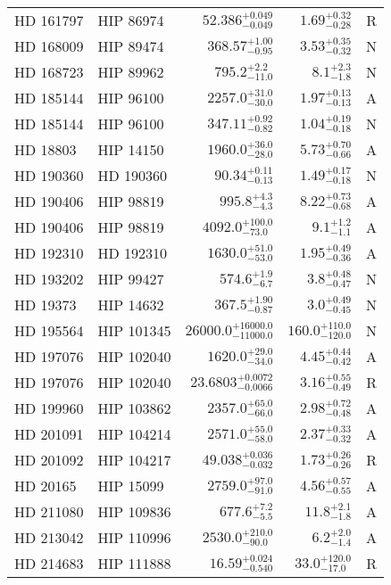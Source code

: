 \begin{longtable*}{llrrr}
HD 161797 & HIP 86974 & $52.386^{+0.049}_{-0.049}$ & $1.69^{+0.32}_{-0.28}$ & R \\
HD 168009 & HIP 89474 & $368.57^{+1.00}_{-0.95}$ & $3.53^{+0.35}_{-0.32}$ & N \\
HD 168723 & HIP 89962 & $795.2^{+2.2}_{-11.0}$ & $8.1^{+2.3}_{-1.8}$ & N \\
HD 185144 & HIP 96100 & $2257.0^{+31.0}_{-30.0}$ & $1.97^{+0.13}_{-0.13}$ & A \\
HD 185144 & HIP 96100 & $347.11^{+0.92}_{-0.82}$ & $1.04^{+0.19}_{-0.18}$ & N \\
HD 18803 & HIP 14150 & $1960.0^{+36.0}_{-28.0}$ & $5.73^{+0.70}_{-0.66}$ & A \\
HD 190360 & HD 190360 & $90.34^{+0.11}_{-0.13}$ & $1.49^{+0.17}_{-0.18}$ & N \\
HD 190406 & HIP 98819 & $995.8^{+4.3}_{-4.3}$ & $8.22^{+0.73}_{-0.68}$ & A \\
HD 190406 & HIP 98819 & $4092.0^{+100.0}_{-73.0}$ & $9.1^{+1.2}_{-1.1}$ & A \\
HD 192310 & HD 192310 & $1630.0^{+51.0}_{-53.0}$ & $1.95^{+0.49}_{-0.36}$ & A \\
HD 193202 & HIP 99427 & $574.6^{+1.9}_{-6.7}$ & $3.8^{+0.48}_{-0.47}$ & N \\
HD 19373 & HIP 14632 & $367.5^{+1.90}_{-0.87}$ & $3.0^{+0.49}_{-0.45}$ & N \\
HD 195564 & HIP 101345 & $26000.0^{+16000.0}_{-11000.0}$ & $160.0^{+110.0}_{-120.0}$ & N \\
HD 197076 & HIP 102040 & $1620.0^{+29.0}_{-34.0}$ & $4.45^{+0.44}_{-0.42}$ & A \\
HD 197076 & HIP 102040 & $23.6803^{+0.0072}_{-0.0066}$ & $3.16^{+0.55}_{-0.49}$ & R \\
HD 199960 & HIP 103862 & $2357.0^{+65.0}_{-66.0}$ & $2.98^{+0.72}_{-0.48}$ & A \\
HD 201091 & HIP 104214 & $2571.0^{+55.0}_{-58.0}$ & $2.37^{+0.33}_{-0.32}$ & A \\
HD 201092 & HIP 104217 & $49.038^{+0.036}_{-0.032}$ & $1.73^{+0.26}_{-0.26}$ & R \\
HD 20165 & HIP 15099 & $2759.0^{+97.0}_{-91.0}$ & $4.56^{+0.57}_{-0.55}$ & A \\
HD 211080 & HIP 109836 & $677.6^{+7.2}_{-5.5}$ & $11.8^{+2.1}_{-1.8}$ & A \\
HD 213042 & HIP 110996 & $2530.0^{+210.0}_{-90.0}$ & $6.2^{+2.0}_{-1.4}$ & A \\
HD 214683 & HIP 111888 & $16.59^{+0.024}_{-0.540}$ & $33.0^{+120.0}_{-17.0}$ & R \\

\end{longtable*}
